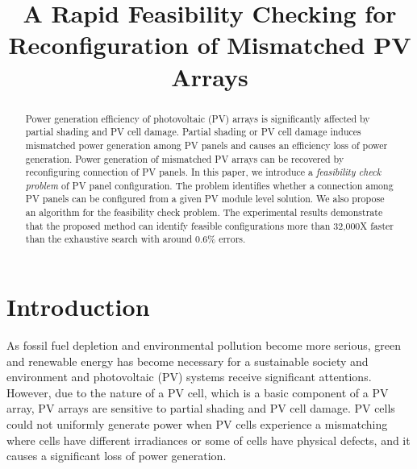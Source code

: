 \documentclass[conference]{IEEEtran}
\begin{document}
\title{A Rapid Feasibility Checking for Reconfiguration of Mismatched PV Arrays}
\author{
}
\maketitle

\begin{abstract}
Power generation efficiency of photovoltaic (PV) arrays is significantly affected by partial shading and PV cell damage. Partial shading or PV cell damage induces mismatched power generation among PV panels and causes an efficiency loss of power generation. Power generation of mismatched PV arrays can be recovered by reconfiguring connection of PV panels. 
In this paper, we introduce a \textit{feasibility check problem} of PV panel configuration.
The problem identifies whether a connection among PV panels can be configured from a given PV module level solution. 
We also propose an algorithm for the feasibility check problem. The experimental results demonstrate that the proposed method can identify feasible configurations more than 32,000X faster than the exhaustive search with around 0.6\% errors. 
\end{abstract}


\section{Introduction}
As fossil fuel depletion and environmental pollution become more serious, green and renewable energy has become necessary for a sustainable society and environment and photovoltaic (PV) systems receive significant attentions. However, due to the nature of a PV cell, which is a basic component of a PV array, PV arrays are sensitive to partial shading and PV cell damage. PV cells could not uniformly generate power when PV cells experience a mismatching where cells have different irradiances or some of cells have physical defects, and it causes a significant loss of power generation. 
\end{document}
